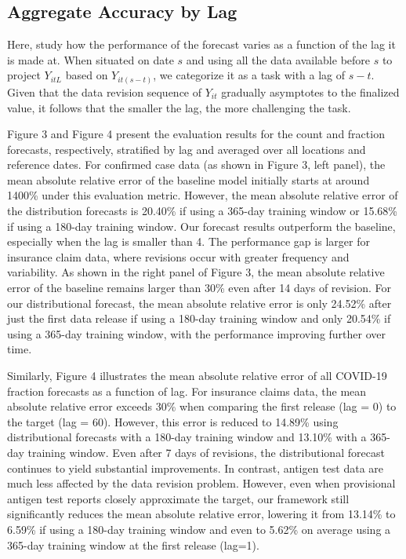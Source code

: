 \subsection{Aggregate Accuracy by Lag}
Here, study how the performance of the forecast varies as a function of the lag it is made at. When situated on date $s$ and using all the data available before $s$ to project $Y_{itL}$ based on $Y_{it(s-t)}$, we categorize it as a task with a lag of $s-t$.  Given that the data revision sequence of $Y_{it}$ gradually asymptotes to the finalized value, it follows that the smaller the lag, the more challenging the task. 

Figure 3 and Figure 4 present the evaluation results for the count and fraction forecasts, respectively, stratified by lag and averaged over all locations and reference dates. For confirmed case data (as shown in Figure 3, left panel), the mean absolute relative error of the baseline model initially starts at around 1400\% under this evaluation metric. However, the mean absolute relative error of the distribution forecasts is 20.40\% if using a 365-day training window or 15.68\% if using a 180-day training window. Our forecast results outperform the baseline, especially when the lag is smaller than 4. The performance gap is larger for insurance claim data, where revisions occur with greater frequency and variability. As shown in the right panel of Figure 3, the mean absolute relative error of the baseline remains larger than 30\% even after 14 days of revision. For our distributional forecast, the mean absolute relative error is only 24.52\% after just the first data release if using a 180-day training window and only 20.54\% if using a 365-day training window, with the performance improving further over time. 

Similarly, Figure 4 illustrates the mean absolute relative error of all COVID-19 fraction forecasts as a function of lag. For insurance claims data, the mean absolute relative error exceeds 30\% when comparing the first release (lag = 0) to the target (lag = 60). However, this error is reduced to 14.89\% using distributional forecasts with a 180-day training window and 13.10\% with a 365-day training window. Even after 7 days of revisions, the distributional forecast continues to yield substantial improvements. In contrast, antigen test data are much less affected by the data revision problem. However, even when provisional antigen test reports closely approximate the target, our framework still significantly reduces the mean absolute relative error, lowering it from 13.14\% to 6.59\% if using a 180-day training window and even to 5.62\% on average using a 365-day training window at the first release (lag=1).


